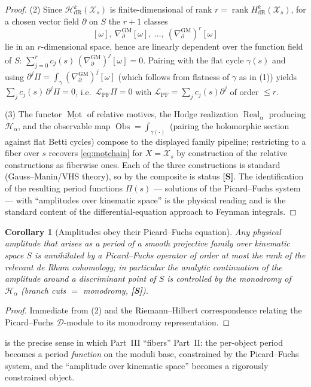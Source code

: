 \documentclass[12pt]{article}
\newtheorem{corollary}[theorem]{Corollary}
\theoremstyle{definition}
\theoremstyle{remark}
\newcommand{\Mot}{\operatorname{Mot}}
\newcommand{\Real}{\operatorname{Real}}
\newcommand{\Obs}{\operatorname{Obs}}
\newcommand{\rk}{\operatorname{rank}}
\newcommand{\GMd}{\nabla^{\mathrm{GM}}_{\partial}}
\newcommand{\status}[1]{\textnormal{\textsf{\textbf{[#1]}}}}
\begin{document}
\begin{proof}
(2) Since $\mathcal H^k_{\mathrm{dR}}(\mathcal X_s)$ is finite-dimensional of rank
$r=\rk H^k_{\mathrm{dR}}(\mathcal X_s)$, for a chosen vector field $\partial$ on $S$ the $r+1$ classes
\[
  [\omega],\ \GMd[\omega],\ \dots,\ (\GMd)^{r}[\omega]
\]
lie in an $r$-dimensional space, hence are linearly dependent over the function field of $S$:
$\sum_{j=0}^{r} c_j(s)\,(\GMd)^{j}[\omega] = 0$. Pairing with the flat cycle $\gamma(s)$ and using
$\partial^j\Pi=\int_\gamma(\GMd)^j[\omega]$ (which follows from flatness of $\gamma$ as in (1)) yields
$\sum_j c_j(s)\,\partial^j\Pi = 0$, i.e.\ $\mathcal L_{\mathrm{PF}}\Pi=0$ with
$\mathcal L_{\mathrm{PF}}=\sum_j c_j(s)\partial^j$ of order $\le r$.

(3) The functor $\underline{\Mot}$ of relative motives, the Hodge realization $\Real_\alpha$ producing
$\mathcal H_\alpha$, and the observable map $\Obs=\int_{\gamma(\cdot)}$ (pairing the holomorphic section
against flat Betti cycles) compose to the displayed family pipeline; restricting to a fiber over $s$
recovers \eqref{eq:motchain} for $X=\mathcal X_s$ by construction of the relative constructions as
fiberwise ones. Each of the three constructions is standard (Gauss--Manin/VHS theory), so by
 the composite is status \status{S}. The identification of the resulting period
functions $\Pi(s)$ --- solutions of the Picard--Fuchs system --- with ``amplitudes over kinematic space''
is the physical reading and is the standard content of the differential-equation approach to Feynman
integrals.
\end{proof}

\begin{corollary}[Amplitudes obey their Picard--Fuchs equation]
\label{cor:amp-pf}
Any physical amplitude that arises as a period of a smooth projective family over kinematic space $S$ is
annihilated by a Picard--Fuchs operator of order at most the rank of the relevant de Rham cohomology; in
particular the analytic continuation of the amplitude around a discriminant point of $S$ is controlled by
the monodromy of $\mathcal H_\alpha$ (branch cuts $=$ monodromy, \status{S}).
\end{corollary}
\begin{proof}
Immediate from (2) and the Riemann--Hilbert correspondence relating the Picard--Fuchs
$\mathcal D$-module to its monodromy representation.
\end{proof}

 is the precise sense in which Part~III ``fibers'' Part~II: the per-object period becomes a
period \emph{function} on the moduli base, constrained by the Picard--Fuchs system, and the
``amplitude over kinematic space'' becomes a rigorously constrained object.
\end{document}
